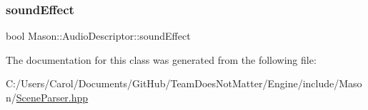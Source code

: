 \hypertarget{class_mason_1_1_audio_descriptor_a860c5957f7c0d3967399f05eb4555554}{}\label{class_mason_1_1_audio_descriptor_a860c5957f7c0d3967399f05eb4555554} 
\subsubsection{\texorpdfstring{sound\+Effect}{soundEffect}}
{\footnotesize\ttfamily bool Mason\+::\+Audio\+Descriptor\+::sound\+Effect}



The documentation for this class was generated from the following file\+:\begin{DoxyCompactItemize}
\item 
C\+:/\+Users/\+Carol/\+Documents/\+Git\+Hub/\+Team\+Does\+Not\+Matter/\+Engine/include/\+Mason/\hyperlink{_scene_parser_8hpp}{Scene\+Parser.\+hpp}\end{DoxyCompactItemize}
